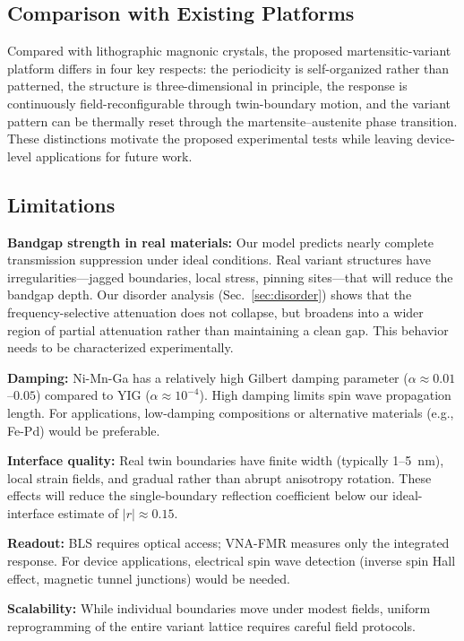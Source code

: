 \documentclass[aip,jap,reprint,floatfix,nofootinbib]{revtex4-2}
\begin{document}
\subsection{Comparison with Existing Platforms}
\label{sec:comparison}

Compared with lithographic magnonic crystals, the proposed martensitic-variant platform differs in four key respects: the periodicity is self-organized rather than patterned, the structure is three-dimensional in principle, the response is continuously field-reconfigurable through twin-boundary motion, and the variant pattern can be thermally reset through the martensite--austenite phase transition. These distinctions motivate the proposed experimental tests while leaving device-level applications for future work.

\subsection{Limitations}
\label{sec:limitations}

\textbf{Bandgap strength in real materials:} Our model predicts nearly complete transmission suppression under ideal conditions. Real variant structures have irregularities---jagged boundaries, local stress, pinning sites---that will reduce the bandgap depth. Our disorder analysis (Sec.~\ref{sec:disorder}) shows that the frequency-selective attenuation does not collapse, but broadens into a wider region of partial attenuation rather than maintaining a clean gap. This behavior needs to be characterized experimentally.

\textbf{Damping:} Ni-Mn-Ga has a relatively high Gilbert damping parameter ($\alpha \approx 0.01$--$0.05$) compared to YIG ($\alpha \approx 10^{-4}$). High damping limits spin wave propagation length. For applications, low-damping compositions or alternative materials (e.g., Fe-Pd) would be preferable.

\textbf{Interface quality:} Real twin boundaries have finite width (typically 1--5~nm), local strain fields, and gradual rather than abrupt anisotropy rotation. These effects will reduce the single-boundary reflection coefficient below our ideal-interface estimate of $|r| \approx 0.15$.

\textbf{Readout:} BLS requires optical access; VNA-FMR measures only the integrated response. For device applications, electrical spin wave detection (inverse spin Hall effect, magnetic tunnel junctions) would be needed.

\textbf{Scalability:} While individual boundaries move under modest fields, uniform reprogramming of the entire variant lattice requires careful field protocols.
\end{document}
